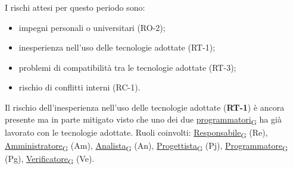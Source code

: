 I rischi attesi per questo periodo sono:
\begin{itemize}
	\item impegni personali o universitari (RO-2);
	\item inesperienza nell'uso delle tecnologie adottate (RT-1);
	\item problemi di compatibilità tra le tecnologie adottate (RT-3);
	\item rischio di conflitti interni (RC-1).
\end{itemize}
Il rischio dell'inesperienza nell'uso delle tecnologie adottate (\textbf{RT-1}) è ancora presente ma in parte mitigato visto che uno dei
due \href{https://7last.github.io/docs/rtb/documentazione-interna/glossario\#programmatore}{programmatori\textsubscript{G}} ha già lavorato con le tecnologie adottate.
\newpage
{}
Ruoli coinvolti: \href{https://7last.github.io/docs/rtb/documentazione-interna/glossario\#responsabile}{Responsabile\textsubscript{G}} (Re), \href{https://7last.github.io/docs/rtb/documentazione-interna/glossario\#amministratore}{Amministratore\textsubscript{G}} (Am), \href{https://7last.github.io/docs/rtb/documentazione-interna/glossario\#analista}{Analista\textsubscript{G}} (An), \href{https://7last.github.io/docs/rtb/documentazione-interna/glossario\#progettista}{Progettista\textsubscript{G}} (Pj), \href{https://7last.github.io/docs/rtb/documentazione-interna/glossario\#programmatore}{Programmatore\textsubscript{G}} (Pg), \href{https://7last.github.io/docs/rtb/documentazione-interna/glossario\#verificatore}{Verificatore\textsubscript{G}} (Ve).
